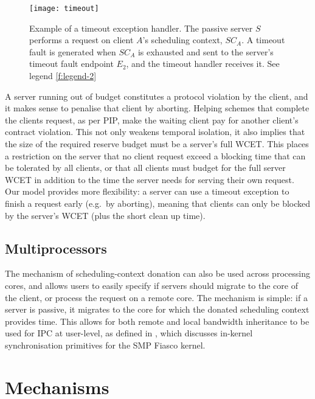 \begin{figure}
    \centering
    \texttt{[image: timeout]}
    \caption[Example of a timeout exception handler.]{Example of a timeout exception handler. The passive server $S$ performs a request on
    client $A$'s scheduling context, $SC_{A}$. A timeout fault is generated when $SC_{A}$ is
exhausted and sent to the server's timeout fault endpoint $E_{2}$, and the timeout handler receives
it. See legend \cref{f:legend-2}}
    \label{f:timeout}
\end{figure}


A server running out of budget constitutes a protocol violation
by the client, and it makes sense to penalise that
client by aborting. Helping schemes that complete the clients request, as per \gls{PIP},
make the waiting client pay for
another client's contract violation. This not only weakens temporal isolation,
it also implies that the size of the required reserve budget
must be a server's full WCET. This places a restriction on the server
that no client request exceed a blocking time that can be tolerated by
all clients, or that all clients must budget for the full server WCET in
addition to the time the server needs for serving their own request.
Our model provides more flexibility: a server can use a timeout
exception to finish a request early (e.g.\ by aborting), meaning that clients can only be
blocked by the server's \gls{WCET} (plus the short
clean up time).

\subsection{Multiprocessors}

The mechanism of scheduling-context donation can also be used across processing cores, and 
allows users to easily specify if servers should migrate to the core of the client, or 
process the request on a remote core. 
The mechanism is simple: if a
server is passive, it migrates to the core for which the donated scheduling context provides
time. This allows for both remote and local bandwidth inheritance to be used for IPC at user-level,
as defined in \citet{Hohmuth_Peter_01}, which discusses in-kernel synchronisation primitives for the
SMP Fiasco kernel.

\section{Mechanisms}
\label{sec:model-mechanisms}

